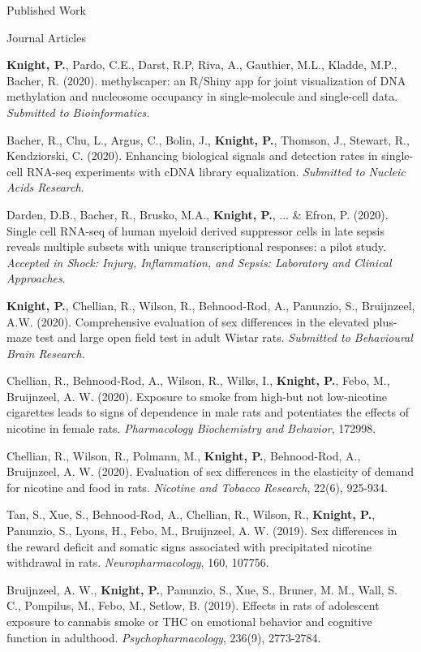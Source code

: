 \documentclass{resume}
\begin{document}
\begin{rSection}{Published Work} %
  \begin{rSubsection}{Journal Articles}{}{}{}
    \item \textbf{Knight, P.}, Pardo, C.E., Darst, R.P, Riva, A.,
      Gauthier, M.L., Kladde, M.P., Bacher, R. (2020). methylscaper:
      an R/Shiny app for joint visualization of DNA methylation and
      nucleosome occupancy in single-molecule and single-cell
      data. \textit{Submitted to Bioinformatics.}
    \item Bacher, R., Chu, L., Argus, C., Bolin, J., \textbf{Knight,
        P.}, Thomson, J., Stewart, R., Kendziorski,
      C. (2020). Enhancing biological signals and detection rates in
      single-cell RNA-seq experiments with cDNA library
      equalization. \textit{Submitted to Nucleic Acids Research}.
    \item Darden, D.B., Bacher, R., Brusko, M.A., \textbf{Knight, P.},
      ... \& Efron, P. (2020). Single cell RNA-seq of human myeloid derived suppressor
      cells in late sepsis reveals multiple subsets with unique
      transcriptional responses: a pilot study. \textit{Accepted in
        Shock: Injury, Inflammation, and Sepsis: Laboratory and
        Clinical Approaches}. 
    \item \textbf{Knight, P.}, Chellian, R., Wilson, R., Behnood-Rod,
      A., Panunzio, S., Bruijnzeel, A.W. (2020). Comprehensive evaluation of sex differences in the elevated
      plus-maze test and large open field test in adult Wistar
      rats. \textit{Submitted to Behavioural Brain Research.}
    \item Chellian, R., Behnood-Rod, A., Wilson, R., Wilks, I.,
      \textbf{Knight, P.}, Febo, M., Bruijnzeel, A. W. (2020). Exposure to
      smoke from high-but not low-nicotine cigarettes leads to signs
      of dependence in male rats and potentiates the effects of
      nicotine in female rats. \textit{Pharmacology Biochemistry and Behavior},
      172998.
    \item Chellian, R., Wilson, R., Polmann, M., \textbf{Knight, P.},
      Behnood-Rod, A., Bruijnzeel, A. W. (2020). Evaluation of sex
      differences in the elasticity of demand for nicotine and food in
      rats. \textit{Nicotine and Tobacco Research}, 22(6), 925-934.
    \item Tan, S., Xue, S., Behnood-Rod, A., Chellian, R., Wilson, R.,
      \textbf{Knight, P.}, Panunzio, S., Lyons, H., Febo, M., Bruijnzeel, A. W. (2019). Sex differences in
      the reward deficit and somatic signs associated with
      precipitated nicotine withdrawal in rats. \textit{Neuropharmacology},
      160, 107756.
    \item Bruijnzeel, A. W., \textbf{Knight, P.}, Panunzio, S., Xue, S.,
      Bruner, M. M., Wall, S. C., Pompilus, M., Febo, M., Setlow, B. (2019). Effects in
      rats of adolescent exposure to cannabis smoke or THC on
      emotional behavior and cognitive function in
      adulthood. \textit{Psychopharmacology}, 236(9), 2773-2784.
    \end{rSubsection}
    \end{rSection}
\end{document}
